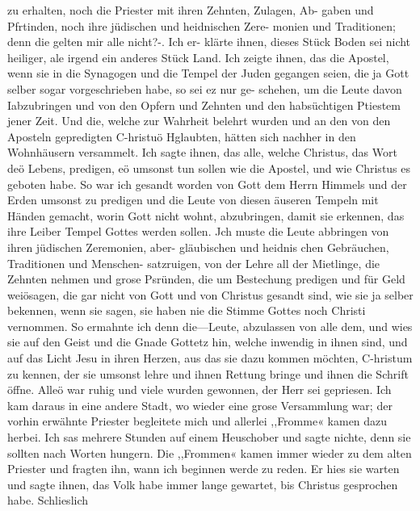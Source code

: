 zu erhalten, noch die Priester mit ihren Zehnten, Zulagen, Ab-
gaben und Pfrtinden, noch ihre jüdischen und heidnischen Zere-
monien und Traditionen; denn die gelten mir alle nicht?-. Ich er-
klärte ihnen, dieses Stück Boden sei nicht heiliger, ale irgend ein
anderes Stück Land. Ich zeigte ihnen, das die Apostel, wenn
sie in die Synagogen und die Tempel der Juden gegangen seien,
die ja Gott selber sogar vorgeschrieben habe, so sei ez nur ge-
schehen, um die Leute davon Iabzubringen und von den Opfern
und Zehnten und den habsüchtigen Ptiestem jener Zeit. Und
die, welche zur Wahrheit belehrt wurden und an den von den
Aposteln gepredigten C-hristuö Hglaubten, hätten sich nachher in
den Wohnhäusern versammelt. Ich sagte ihnen, das alle, welche
Christus, das Wort deö Lebens, predigen, eö umsonst tun sollen
wie die Apostel, und wie Christus es geboten habe. So war ich
gesandt worden von Gott dem Herrn Himmels und der Erden
umsonst zu predigen und die Leute von diesen äuseren Tempeln
mit Händen gemacht, worin Gott nicht wohnt, abzubringen, damit
sie erkennen, das ihre Leiber Tempel Gottes werden sollen. Jch
muste die Leute abbringen von ihren jüdischen Zeremonien, aber-
gläubischen und heidnis chen Gebräuchen, Traditionen und Menschen-
satzruigen, von der Lehre all der Mietlinge, die Zehnten nehmen
und grose Psründen, die um Bestechung predigen und für Geld
weiösagen, die gar nicht von Gott und von Christus gesandt
sind, wie sie ja selber bekennen, wenn sie sagen, sie haben nie
die Stimme Gottes noch Christi vernommen. So ermahnte ich
denn die—Leute, abzulassen von alle dem, und wies sie auf den
Geist und die Gnade Gottetz hin, welche inwendig in ihnen sind,
und auf das Licht Jesu in ihren Herzen, aus das sie dazu kommen
möchten, C-hristum zu kennen, der sie umsonst lehre und ihnen
Rettung bringe und ihnen die Schrift öffne. Alleö war ruhig
und viele wurden gewonnen, der Herr sei gepriesen.
Ich kam daraus in eine andere Stadt, wo wieder eine grose
Versammlung war; der vorhin erwähnte Priester begleitete mich
und allerlei ,,Fromme« kamen dazu herbei. Ich sas mehrere
Stunden auf einem Heuschober und sagte nichte, denn sie sollten
nach Worten hungern. Die ,,Frommen« kamen immer wieder
zu dem alten Priester und fragten ihn, wann ich beginnen werde
zu reden. Er hies sie warten und sagte ihnen, das Volk habe
immer lange gewartet, bis Christus gesprochen habe. Schlieslich


